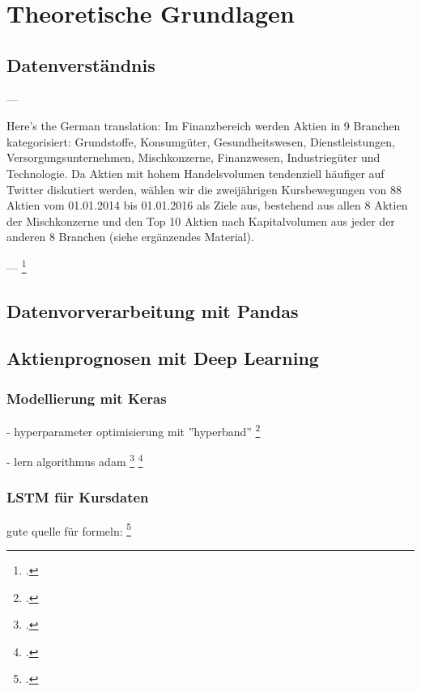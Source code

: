 \newpage
\section{Theoretische Grundlagen}\label{sec:theorie}



\subsection{Datenverständnis}\label{sec:theorie_data_understanding}

---

Here's the German translation:
Im Finanzbereich werden Aktien in 9 Branchen kategorisiert: Grundstoffe, Konsumgüter, Gesundheitswesen, Dienstleistungen, Versorgungsunternehmen, Mischkonzerne, Finanzwesen, Industriegüter und Technologie. Da Aktien mit hohem Handelsvolumen tendenziell häufiger auf Twitter diskutiert werden, wählen wir die zweijährigen Kursbewegungen von 88 Aktien vom 01.01.2014 bis 01.01.2016 als Ziele aus, bestehend aus allen 8 Aktien der Mischkonzerne und den Top 10 Aktien nach Kapitalvolumen aus jeder der anderen 8 Branchen (siehe ergänzendes Material).

---
\footcite[Kap. 3]{xu2018StockMovement}

\subsection{Datenvorverarbeitung mit Pandas}\label{sec:theorie_pandas}


\subsection{Aktienprognosen mit Deep Learning}\label{sec:theorie_dl}

\subsubsection{Modellierung mit Keras}\label{sec:theorie_keras}
- hyperparameter optimisierung mit ''hyperband''
\footcite{li2018hyperband}

- lern algorithmus adam 
\footcite{website:keras-adam}
\footcite{kingma2015adam}

\subsubsection{LSTM für Kursdaten}\label{sec:theorie_lstm}

gute quelle für formeln: \footcite{guan2020stockprice}

